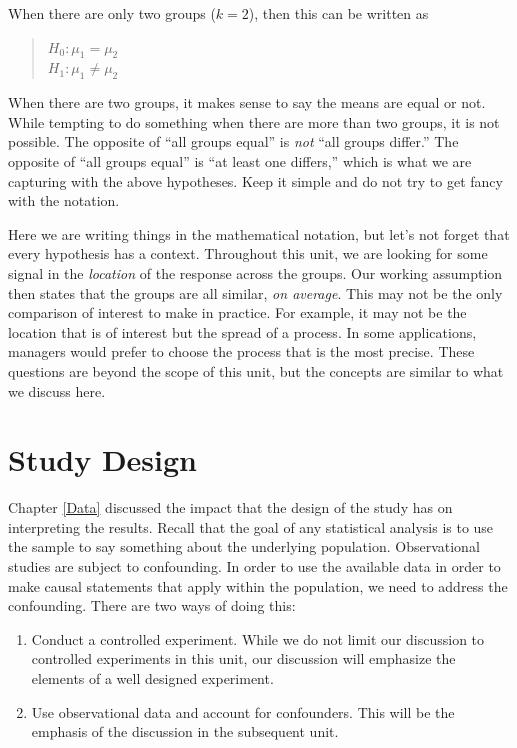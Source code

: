 \documentclass[]{book}
\providecommand{\tightlist}{%
  \setlength{\itemsep}{0pt}\setlength{\parskip}{0pt}}
\theoremstyle{definition}
\theoremstyle{definition}
\theoremstyle{definition}
\theoremstyle{remark}
\let\BeginKnitrBlock\begin \let\EndKnitrBlock\end
\begin{document}
When there are only two groups (\(k = 2\)), then this can be written as

\begin{quote}
\(H_0: \mu_1 = \mu_2\)\\
\(H_1: \mu_1 \neq \mu_2\)
\end{quote}

\BeginKnitrBlock{rmdtip}
When there are two groups, it makes sense to say the means are equal or
not. While tempting to do something when there are more than two groups,
it is not possible. The opposite of ``all groups equal'' is \emph{not}
``all groups differ.'' The opposite of ``all groups equal'' is ``at
least one differs,'' which is what we are capturing with the above
hypotheses. Keep it simple and do not try to get fancy with the
notation.
\EndKnitrBlock{rmdtip}

Here we are writing things in the mathematical notation, but let's not
forget that every hypothesis has a context. Throughout this unit, we are
looking for some signal in the \emph{location} of the response across
the groups. Our working assumption then states that the groups are all
similar, \emph{on average}. This may not be the only comparison of
interest to make in practice. For example, it may not be the location
that is of interest but the spread of a process. In some applications,
managers would prefer to choose the process that is the most precise.
These questions are beyond the scope of this unit, but the concepts are
similar to what we discuss here.

\chapter{Study Design}\label{ANOVAdata}

Chapter \ref{Data} discussed the impact that the design of the study has
on interpreting the results. Recall that the goal of any statistical
analysis is to use the sample to say something about the underlying
population. Observational studies are subject to confounding. In order
to use the available data in order to make causal statements that apply
within the population, we need to address the confounding. There are two
ways of doing this:

\begin{enumerate}
\def\labelenumi{\arabic{enumi}.}
\tightlist
\item
  Conduct a controlled experiment. While we do not limit our discussion
  to controlled experiments in this unit, our discussion will emphasize
  the elements of a well designed experiment.
\item
  Use observational data and account for confounders. This will be the
  emphasis of the discussion in the subsequent unit.
\end{enumerate}
\end{document}
